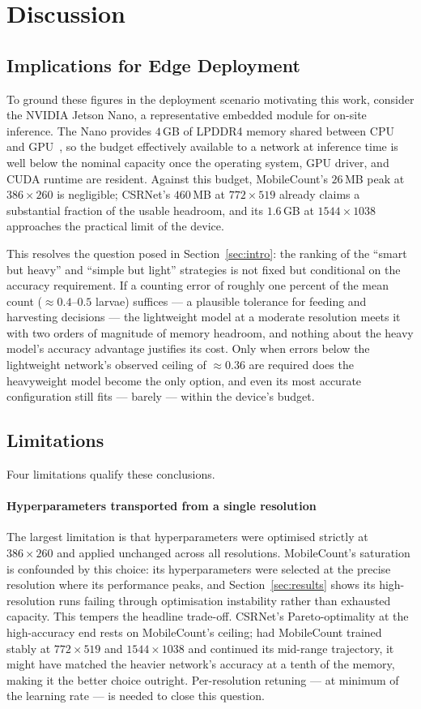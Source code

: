 \documentclass[conference]{IEEEtran}
\begin{document}
\section{Discussion}\label{sec:discussion}
\subsection{Implications for Edge Deployment}
To ground these figures in the deployment scenario motivating this work,
consider the NVIDIA Jetson Nano, a representative embedded module for on-site
inference. The Nano provides $4$\,GB of LPDDR4 memory shared between CPU and
GPU~\cite{nvidia2024jetsonnano}, so the budget effectively available to a
network at inference time is well below the nominal capacity once the
operating system, GPU driver, and CUDA runtime are resident. Against this
budget, MobileCount's $26$\,MB peak at $386\times260$ is negligible; CSRNet's
$460$\,MB at $772\times519$ already claims a substantial fraction of the
usable headroom, and its $1.6$\,GB at $1544\times1038$ approaches the
practical limit of the device.

This resolves the question posed in Section~\ref{sec:intro}: the ranking of
the ``smart but heavy'' and ``simple but light'' strategies is not fixed but
conditional on the accuracy requirement. If a counting error of roughly one
percent of the mean count (${\approx}0.4$--$0.5$ larvae) suffices — a
plausible tolerance for feeding and harvesting decisions — the lightweight
model at a moderate resolution meets it with two orders of magnitude of
memory headroom, and nothing about the heavy model's accuracy advantage
justifies its cost. Only when errors below the lightweight network's observed
ceiling of ${\approx}0.36$ are required does the heavyweight model become the
only option, and even its most accurate configuration still fits — barely —
within the device's budget.

\subsection{Limitations}
Four limitations qualify these conclusions.

\paragraph{Hyperparameters transported from a single resolution}
The largest limitation is that hyperparameters were optimised strictly at
$386\times260$ and applied unchanged across all resolutions. MobileCount's
saturation is confounded by this choice: its hyperparameters were selected at
the precise resolution where its performance peaks, and
Section~\ref{sec:results} shows its high-resolution runs failing through
optimisation instability rather than exhausted capacity. This tempers the
headline trade-off. CSRNet's Pareto-optimality at the high-accuracy end rests
on MobileCount's ceiling; had MobileCount trained stably at
$772\times519$ and $1544\times1038$ and continued its mid-range trajectory,
it might have matched the heavier network's accuracy at a tenth of the memory,
making it the better choice outright. Per-resolution retuning — at minimum of
the learning rate — is needed to close this question.
\end{document}

